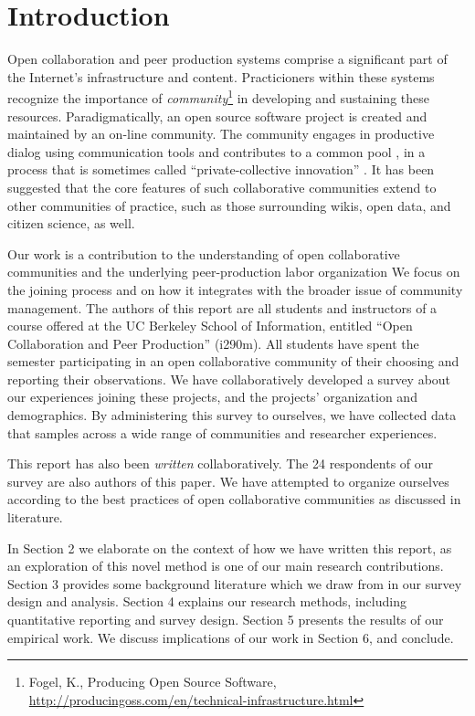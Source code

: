 \section{Introduction}

Open collaboration and peer production systems comprise a significant
part of the Internet's infrastructure and content.
Practicioners within these systems recognize the importance of
\emph{community}\footnote{Fogel, K., Producing Open Source Software, \url{http://producingoss.com/en/technical-infrastructure.html}} in developing and sustaining these resources.
Paradigmatically, an open source software project is created and maintained by an on-line community.
The community engages in productive dialog using communication tools and contributes to
a common pool \cite{ostrom1990}, in a process that is sometimes called ``private-collective innovation'' \cite{vonhippel2003oss}.
It has been suggested that the core features of such collaborative
communities extend to other communities of practice, such as those
surrounding wikis, open data, and citizen science, as well.

Our work is a contribution to the understanding of open collaborative
communities and the underlying peer-production labor organization \cite{benkler2002}
We focus on the joining process and on how
it integrates with the broader issue of community management.
The authors of this report are all students and instructors of a
course offered at the UC Berkeley School of Information, entitled ``Open Collaboration and Peer Production'' (i290m).
All students have spent the semester participating in an open
collaborative community of their choosing and reporting
their observations.
We have collaboratively developed a survey about our experiences joining
these projects, and the projects' organization and demographics.
By administering this survey to ourselves, we have collected data
that samples across a wide range of communities and researcher experiences.



This report has also been \emph{written} collaboratively.
The 24 respondents of our survey are also authors of this paper.
We have attempted to organize ourselves according
to the best practices of open collaborative communities as discussed in literature.


In Section 2 we elaborate on the context of how we have written this report, as an exploration of this novel method is one of our main research contributions.
Section 3 provides some background literature which we draw from in
our survey design and analysis.
Section 4 explains our research methods, including quantitative
reporting and survey design.
Section 5 presents the results of our empirical work.
We discuss implications of our work in Section 6, and conclude. 


